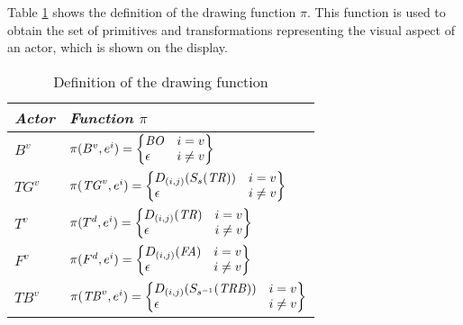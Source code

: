 \documentclass[10pt,journal,letterpaper,compsoc]{IEEEtran}
\begin{document}
Table \ref{table5} shows the definition of the drawing function $\pi$. This function is used to obtain the set of primitives and transformations representing the visual aspect of an actor, which is shown on the display.




\begin{table}[h]
\caption{Definition of the drawing function}
\label{table5}
\begin{center}
\begin{small}
\begin{tabular}{|l|l|}

    \hline \itshape Actor & \itshape Function ${\pi}$ \\
    \hline
    $B^{v}$ &
    $\pi (B^{v},e^{i})=\left\{\begin{matrix}\mathit{BO}\hfill\null
        &i=v\hfill\null \\\epsilon \hfill\null &i\neq v\hfill\null
        \end{matrix}\right\}$   \\

    \hline
    $TG^{v}$ &
    $\pi (\mathit{TG}^{v},e^{i})=\left\{\begin{matrix}D_{(i,j)}(S_{s}(\mathit{TR}))\hfill\null
        &i=v\hfill\null \\\epsilon \hfill\null &i\neq v\hfill\null
        \end{matrix}\right\}$   \\

    \hline
    $T^{v}$ &
    $\pi(T^{d},e^{i})=\left\{\begin{matrix}D_{(i,j)}(\mathit{TR})\hfill\null
        &i=v\hfill\null \\\epsilon \hfill\null &i\neq v\hfill\null
        \end{matrix}\right\}$   \\

    \hline
    $F^{v}$ &
    $\pi(F^{d},e^{i})=\left\{\begin{matrix}D_{(i,j)}(\mathit{FA})\hfill\null
        &i=v\hfill\null \\\epsilon \hfill\null &i\neq v\hfill\null
        \end{matrix}\right\}$   \\

    \hline
    $TB^{v}$ &
    $\pi(\mathit{TB}^{v},e^{i})=\left\{\begin{matrix}D_{(i,j)}(S_{s^{-1}}(\mathit{TRB}))\hfill\null
        &i=v\hfill\null \\\epsilon \hfill\null &i\neq v\hfill\null
        \end{matrix}\right\}$   \\

    \hline
\end{tabular}
\end{small}
\end{center}
\end{table}
\end{document}
